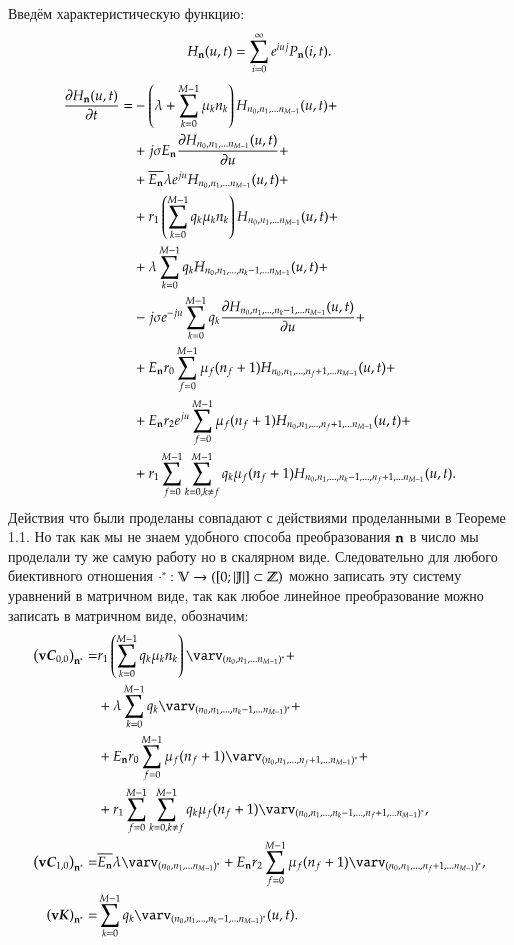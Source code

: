 Введём характеристическую функцию:
\[{H}_{\bold{n}}(u,t)=\sum_{i=0}^\infty e^{iuj}{P}_{\bold{n}}(i,t).\]
\begin{equation*}\begin{aligned}
\pdv{{H}_{\bold{n}}(u,t)}{t}=
    &-\left( {\lambda+\sum_{{k}=0}^{M-1}\mu_{k}{n}_{k}} \right){H}_{{n}_0, {n}_1, ... {n}_{M-1}}(u,t)+\\
    &+j \sigma E_{\bold{n}} \pdv{ {H}_{{n}_0, {n}_1, ... {n}_{M-1}} (u,t)}{u}(i,t) + \\
    &+\overline{E_{\bold{n}}} \lambda e^{ju} {H}_{{n}_0, {n}_1, ... {n}_{M-1}}(u,t)+\\
    &+r_1 \left( {\sum_{{k}=0}^{M-1} q_{k}\mu_{k}{n}_{k}} \right) {H}_{{n}_0, {n}_1, ... {n}_{M-1}}(u,t) + \\
    &+\lambda\sum_{k=0}^{M-1}q_k {H}_{{n}_0, {n}_1, ... , {n}_{k} - 1, ... {n}_{M-1}}(u,t) + \\
    &-j \sigma  e^{-ju} \sum_{k=0}^{M-1}q_k \pdv{ {H}_{{n}_0, {n}_1, ... , {n}_{k} - 1, ... {n}_{M-1}} (u,t)}{u} + \\
    &+E_{\bold{n}} r_0 \sum_{f=0}^{M-1} \mu_f (n_f + 1) {H}_{{n}_0, {n}_1, ... , {n}_{f} + 1, ... {n}_{M-1}}(u,t) + \\
    &+E_{\bold{n}} r_2 e^{ju} \sum_{f=0}^{M-1} \mu_f (n_f + 1) {H}_{{n}_0, {n}_1, ... , {n}_{f} + 1, ... {n}_{M-1}}(u,t) + \\
    &+r_1 \sum_{{f}=0}^{M-1} \sum_{{k}=0, {k} \neq {f}}^{M-1}
        q_k \mu_f (n_f+1) {H}_{{n}_0, {n}_1, ... , {n}_{k} - 1, ... , {n}_{f} + 1, ... {n}_{M-1}}(u,t).
\end{aligned}\end{equation*}
Действия что были проделаны совпадают с действиями проделанными в Теореме 1.1.
Но так как мы не знаем удобного способа преобразования \(\bold{n}\) 
в число мы проделали ту же самую работу но в скалярном виде.
Следовательно для любого биективного отношения
\(\cdot^* : \mathbb{V} \rightarrow ([0;|\mathbb{J}|] \subset \mathbb{Z} )\)
можно записать эту систему уравнений в матричном виде,
так как любое линейное преобразование можно записать в
матричном виде, обозначим:
\begin{equation}\begin{aligned}
\Q{\bold{v}\boldsymbol{C}_{0,0}}_{\bold{n}^*} =&
    r_1 \Q{\allExecutionRelativeIntensity{n}{k}} \seqStandartStar{\varv}{n} + \\
    &+\lambda\sum_{k=0}^{M-1}q_k \seqMinusStar{\varv}{n}{k} + \\
    &+\En r_0 \sum_{f=0}^{M-1} \mu_f (n_f + 1) \seqPlusStar{\varv}{n}{f} + \\
    &+r_1 \feedbackSum{f}{k} q_k \mu_f (n_f+1) \seqMinusPlusStar{\varv}{n}{k}{f}, \\
\Q{\bold{v}\boldsymbol{C}_{1,0}}_{\bold{n}^*} =
    &\overline{\En} \lambda \seqStandartStar{\varv}{n}+
    \En r_2 \sum_{f=0}^{M-1} \mu_f (n_f + 1) \seqPlusStar{\varv}{n}{f}, \\
\Q{\bold{v}\boldsymbol{K}}_{\bold{n}^*} =
    &\sum_{k=0}^{M-1}q_k\seqMinusStar{\varv}{n}{k}(u,t).
\end{aligned}\end{equation}
